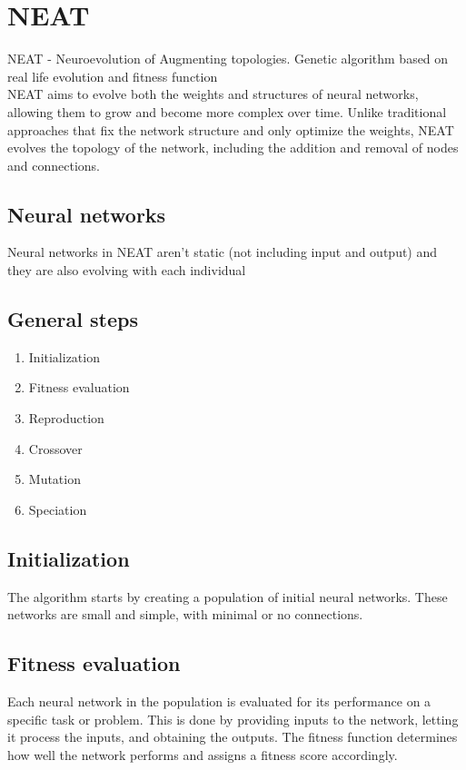 \section{NEAT}
\label{sec:neat}

NEAT - Neuroevolution of Augmenting topologies. Genetic algorithm based on real life evolution and fitness function \\

NEAT aims to evolve both the weights and structures of neural networks, allowing them to grow and become more complex over time. Unlike traditional approaches that fix the network structure and only optimize the weights, NEAT evolves the topology of the network, including the addition and removal of nodes and connections.

\subsection{Neural networks}

Neural networks in NEAT aren't static (not including input and output) and they are also evolving with each individual

\subsection{General steps}

\begin{enumerate}
    \item Initialization
    \item Fitness evaluation
    \item Reproduction
    \item Crossover
    \item Mutation
    \item Speciation
\end{enumerate}

\subsection{Initialization}

The algorithm starts by creating a population of initial neural networks. These networks are small and simple, with minimal or no connections.

\subsection{Fitness evaluation}

Each neural network in the population is evaluated for its performance on a specific task or problem. This is done by providing inputs to the network, letting it process the inputs, and obtaining the outputs. The fitness function determines how well the network performs and assigns a fitness score accordingly.

